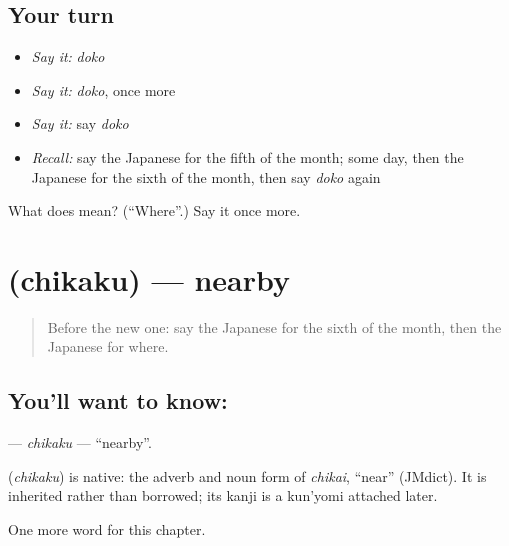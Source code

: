 \subsection*{Your turn}
\begin{itemize}
\raggedright
  \item \emph{Say it:} \emph{doko}
  \item \emph{Say it:} \emph{doko}, once more
  \item \emph{Say it:} say \emph{doko}
  \item \emph{Recall:} say the Japanese for the fifth of the month; some day, then the Japanese for the sixth of the month, then say \emph{doko} again
\end{itemize}

\begin{tcolorbox}[breakable,colback=teal!4,colframe=teal!35!black,title={Before you move on}]
What does  mean? (\textquotedblleft{}Where\textquotedblright{}.) Say it once more.
\end{tcolorbox}
\section[\texorpdfstring{\ja{ちかく} (chikaku)}{ちかく (chikaku)}]{ (chikaku) — nearby}

\label{lesson:JA-C78-chikaku}



\begin{quote}
Before the new one: say the Japanese for the sixth of the month, then the Japanese for where.
\end{quote}

\subsection*{You'll want to know: }
\textbf{} — \emph{chikaku} — \textquotedblleft{}nearby\textquotedblright{}.

\begin{cousinweb}
\textbf{} (\emph{chikaku}) is native: the adverb and noun form of \emph{chikai}, \textquotedblleft{}near\textquotedblright{} (JMdict). It is inherited rather than borrowed; its kanji is a kun'yomi attached later.
\end{cousinweb}

\begin{grammarlens}[title={What you've built}]
One more word for this chapter.
\end{grammarlens}

